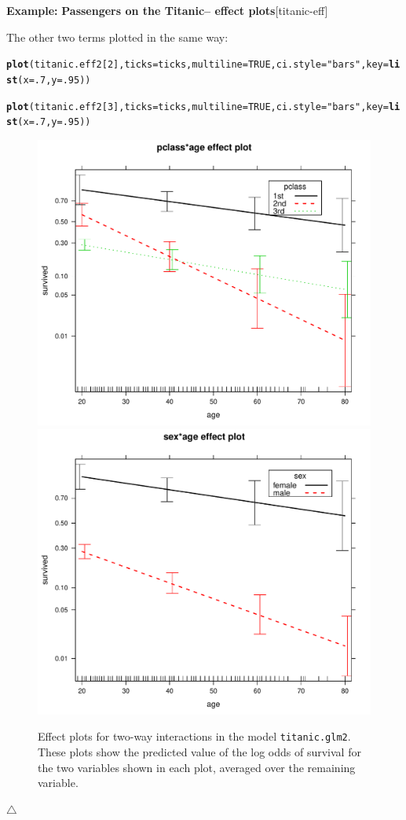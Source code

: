 \documentclass{article}
\makeatletter
\newcommand{\hlnum}[1]{\textcolor[rgb]{0.686,0.059,0.569}{#1}}%
\newcommand{\hlstr}[1]{\textcolor[rgb]{0.192,0.494,0.8}{#1}}%
\newcommand{\hlstd}[1]{\textcolor[rgb]{0.345,0.345,0.345}{#1}}%
\newcommand{\hlkwc}[1]{\textcolor[rgb]{0.333,0.667,0.333}{#1}}%
\newcommand{\hlkwd}[1]{\textcolor[rgb]{0.737,0.353,0.396}{\textbf{#1}}}%
\newenvironment{kframe}{%
 \def\at@end@of@kframe{}%
 \ifinner\ifhmode%
  \def\at@end@of@kframe{\end{minipage}}%
  \begin{minipage}{\columnwidth}%
 \fi\fi%
 \def\FrameCommand##1{\hskip\@totalleftmargin \hskip-\fboxsep
 \colorbox{shadecolor}{##1}\hskip-\fboxsep
     \hskip-\linewidth \hskip-\@totalleftmargin \hskip\columnwidth}%
 \MakeFramed {\advance\hsize-\width
   \@totalleftmargin\z@ \linewidth\hsize
   \@setminipage}}%
 {\par\unskip\endMakeFramed%
 \at@end@of@kframe}
\newenvironment{knitrout}{}{} %
\newenvironment{Example}[2][unnamed-example]%
  {\medskip\noindent\textbf{\textsf{Example:}}
   \textbf{#2}\hfill [#1]\par\smallskip
  }
  {\hfill $\triangle$}
\makeatother
\begin{document}
\begin{Example}[titanic-eff]{Passengers on the Titanic-- effect plots}
The other two terms plotted in the same way:
\begin{knitrout}
\color{fgcolor}\begin{kframe}
\begin{alltt}
\hlkwd{plot}\hlstd{(titanic.eff2[}\hlnum{2}\hlstd{],} \hlkwc{ticks}\hlstd{=ticks,} \hlkwc{multiline}\hlstd{=}\hlnum{TRUE}\hlstd{,} \hlkwc{ci.style}\hlstd{=}\hlstr{"bars"}\hlstd{,} \hlkwc{key}\hlstd{=}\hlkwd{list}\hlstd{(}\hlkwc{x}\hlstd{=}\hlnum{.7}\hlstd{,} \hlkwc{y}\hlstd{=}\hlnum{.95}\hlstd{))}
\end{alltt}
\end{kframe}
\end{knitrout}
\begin{knitrout}
\color{fgcolor}\begin{kframe}
\begin{alltt}
\hlkwd{plot}\hlstd{(titanic.eff2[}\hlnum{3}\hlstd{],} \hlkwc{ticks}\hlstd{=ticks,} \hlkwc{multiline}\hlstd{=}\hlnum{TRUE}\hlstd{,} \hlkwc{ci.style}\hlstd{=}\hlstr{"bars"}\hlstd{,} \hlkwc{key}\hlstd{=}\hlkwd{list}\hlstd{(}\hlkwc{x}\hlstd{=}\hlnum{.7}\hlstd{,} \hlkwc{y}\hlstd{=}\hlnum{.95}\hlstd{))}
\end{alltt}
\end{kframe}
\end{knitrout}

\begin{figure}[htb!]
\includegraphics[width = .49\linewidth]{figure/titanic-eff2-2-1}
\includegraphics[width = .49\linewidth]{figure/titanic-eff2-3-1}
\caption{Effect plots for two-way interactions in the model \texttt{titanic.glm2}.
These plots show the predicted value of the log odds of survival for the two
variables shown in each plot, averaged over the remaining variable.}
\label{fig:titanic-eff2-23}
\end{figure}


\end{Example}
\end{document}
